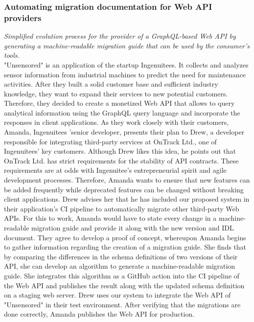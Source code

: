 \subsubsection{Automating migration documentation for Web API providers}
\label{subsubsec:Scenario:graphQLScenario}

\textit{Simplified evolution process for the provider of a GraphQL-based Web API by generating a machine-readable migration guide that can be used by the consumer's tools.}
\medskip
\\ "Unsensored" is an application of the startup Ingenuitees. It collects and analyzes sensor information from industrial machines to predict the need for maintenance activities. After they built a solid customer base and sufficient industry knowledge, they want to expand their services to new potential customers. Therefore, they decided to create a monetized Web API that allows to query analytical information using the GraphQL query language and incorporate the responses in client applications. As they work closely with their customers, Amanda, Ingenuitees 'senior developer, presents their plan to Drew, a developer responsible for integrating third-party services at OnTrack Ltd., one of Ingenuitees' key customers. Although Drew likes this idea, he points out that OnTrack Ltd. has strict requirements for the stability of API contracts. These requirements are at odds with Ingenuitee's entrepreneurial spirit and agile development processes. Therefore, Amanda wants to ensure that new features can be added frequently while deprecated features can be changed without breaking client applications. Drew advises her that he has included our proposed system in their application's CI pipeline to automatically migrate other third-party Web APIs. For this to work, Amanda would have to state every change in a machine-readable migration guide and provide it along with the new version and IDL document. They agree to develop a proof of concept, whereupon Amanda begins to gather information regarding the creation of a migration guide. She finds that by comparing the differences in the schema definitions of two versions of their API, she can develop an algorithm to generate a machine-readable migration guide. She integrates this algorithm as a GitHub action into the CI pipeline of the Web API and publishes the result along with the updated schema definition on a staging web server. Drew uses our system to integrate the Web API of "Unsensored" in their test environment. After verifying that the migrations are done correctly, Amanda publishes the Web API for production.